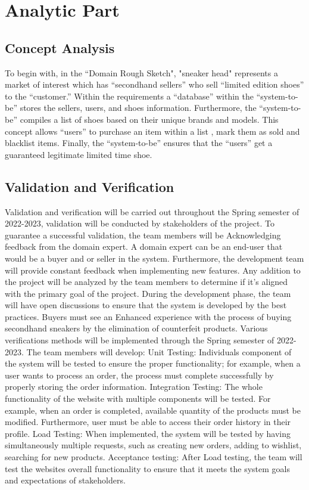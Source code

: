 \chapter{Analytic Part}
\newpage
\section{Concept Analysis}
\hspace{1cm} To begin with, in the “Domain Rough Sketch", 
"sneaker head" represents a market of interest which has “secondhand sellers” who sell “limited edition shoes” to the “customer.” 
Within the requirements a “database” within the “system-to-be” stores the sellers, users, and shoes information. 
Furthermore, the “system-to-be” compiles a list of shoes based on their unique brands and models. 
This concept allows “users” to purchase an item within a list , mark them as sold and blacklist items. 
Finally, the “system-to-be” ensures that the “users” get a guaranteed legitimate limited time shoe.
\section{Validation and Verification}
\hspace{1cm} Validation and verification will be carried out throughout the Spring semester of 2022-2023, 
validation will be conducted by stakeholders of the project. To guarantee a successful validation, the 
team members will be Acknowledging feedback from the domain expert. A domain expert can be an 
end-user that would be a buyer and or seller in the system. Furthermore, the development team will 
provide constant feedback when implementing new features. Any addition to the project will be 
analyzed by the team members to determine if it’s aligned with the primary goal of the project. During 
the development phase, the team will have open discussions to ensure that the system is developed by 
the best practices. Buyers must see an Enhanced experience with the process of buying secondhand 
sneakers by the elimination of counterfeit products. 
Various verifications methods will be implemented through the Spring semester of 2022-2023. The team 
members will develop:
Unit Testing: Individuals component of the system will be tested to ensure the proper functionality; for 
example, when a user wants to process an order, the process must complete successfully by properly 
storing the order information.
Integration Testing: The whole functionality of the website with multiple components will be tested. For 
example, when an order is completed, available quantity of the products must be modified. 
Furthermore, user must be able to access their order history in their profile.
Load Testing: When implemented, the system will be tested by having simultaneously multiple requests, 
such as creating new orders, adding to wishlist, searching for new products.
Acceptance testing: After Load testing, the team will test the websites overall functionality to ensure 
that it meets the system goals and expectations of stakeholders. 

